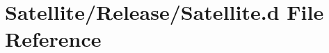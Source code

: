 \hypertarget{_release_2_satellite_8d}{\section{Satellite/\-Release/\-Satellite.d File Reference}
\label{_release_2_satellite_8d}
}
